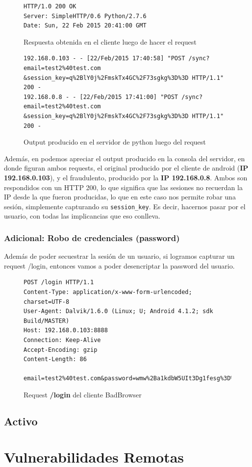 \documentclass[11pt, a4paper, twoside]{article}
\begin{document}
\begin{figure}[H]
\begin{Verbatim}[frame=single,fontsize=\small]
HTTP/1.0 200 OK
Server: SimpleHTTP/0.6 Python/2.7.6
Date: Sun, 22 Feb 2015 20:41:00 GMT
\end{Verbatim}
\caption{Respuesta obtenida en el cliente luego de hacer el request}
\label{fig:sync-simulado2}
\end{figure}

\begin{figure}[H]
\begin{Verbatim}[frame=single,fontsize=\small]
192.168.0.103 - - [22/Feb/2015 17:40:58] "POST /sync?email=test2%40test.com
&session_key=q%2BlY0j%2FmskTx4GC%2F73sgkg%3D%3D HTTP/1.1" 200 -
192.168.0.8 - - [22/Feb/2015 17:41:00] "POST /sync?email=test2%40test.com
&session_key=q%2BlY0j%2FmskTx4GC%2F73sgkg%3D%3D HTTP/1.1" 200 -
\end{Verbatim}
\caption{Output producido en el servidor de python luego del request}
\label{fig:sync-simulado3}
\end{figure}

Además, en  podemos apreciar el output producido en la consola del servidor, en donde figuran ambos requests, el original producido por el cliente de android (\textbf{IP 192.168.0.103}), y el fraudulento, producido por la \textbf{IP 192.168.0.8}. Ambos son respondidos con un HTTP 200, lo que significa que las sesiones no recuerdan la IP desde la que fueron producidas, lo que en este caso nos permite robar una sesión, simplemente capturando su \texttt{session\_key}. Es decir, hacernos pasar por el usuario, con todas las implicancias que eso conlleva.

\subsubsection{Adicional: Robo de credenciales (password)}
Además de poder secuestrar la sesión de un usuario, si logramos capturar un request /login, entonces vamos a poder desencriptar la password del usuario.

\begin{figure}[H]
\begin{Verbatim}[frame=single,fontsize=\small]
POST /login HTTP/1.1
Content-Type: application/x-www-form-urlencoded; charset=UTF-8
User-Agent: Dalvik/1.6.0 (Linux; U; Android 4.1.2; sdk Build/MASTER)
Host: 192.168.0.103:8888
Connection: Keep-Alive
Accept-Encoding: gzip
Content-Length: 86

email=test2%40test.com&password=wmw%2Ba1kdbW5UIt3Dg1fesg%3D%3D%0A&uuid=000000000000000
\end{Verbatim}
\caption{Request \textbf{\color{red}/login} del cliente BadBrowser}
\label{fig:sniffer-login}
\end{figure}

\subsection{Activo}

%
%
\clearpage
{}
\section{Vulnerabilidades Remotas}
\end{document}
